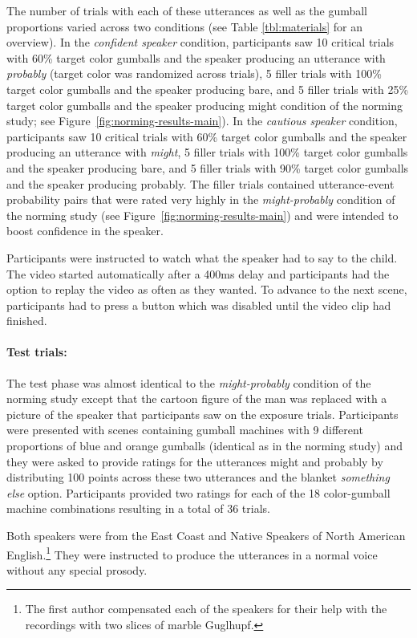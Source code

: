 \documentclass[lucida,biblatex]{sp} %
\newcommand{\figref}[1]{Figure~\ref{#1}}
\begin{document}
The number of trials with each of these utterances as well as the gumball proportions varied across two conditions (see Table \ref{tbl:materials} for an overview). In the {\it confident speaker} condition, participants saw 10 critical trials with 60\% target color gumballs and the speaker producing an utterance with \emph{probably} (target color was randomized across trials), 5 filler trials with 100\% target color gumballs and the speaker producing {\sc bare}, and 5 filler trials with 25\% target color gumballs and the speaker producing {\sc might} condition of the norming study; see \figref{fig:norming-results-main}). In the {\it cautious speaker} condition, participants saw 10 critical trials with 60\% target color gumballs and the speaker producing an utterance with \emph{might}, 5 filler trials with 100\% target color gumballs and the speaker producing {\sc bare}, and 5 filler trials with 90\% target color gumballs and the speaker producing {\sc probably}. The filler trials contained utterance-event probability pairs that were rated very highly in the \textit{might-probably} condition of the norming study (see \figref{fig:norming-results-main}) and were intended to boost confidence in the speaker.

Participants were instructed to watch what the speaker had to say to the child. The video started automatically after a 400ms delay and participants had the option to replay the video as often as they wanted. To advance to the next scene, participants had to press a button which was disabled until the video clip had finished.

\paragraph{Test trials:} The test phase was almost identical to the  \textit{might-probably} condition of the norming study except that the cartoon figure of the man was replaced with a picture of the speaker that participants saw on the exposure trials. Participants were presented with scenes containing gumball machines with 9 different proportions of blue and orange gumballs  (identical as in the norming study) and they were asked to provide ratings for the utterances {\sc might} and {\sc probably} by distributing 100 points across these two utterances and the blanket {\it something else} option. Participants provided two ratings for each of the 18 color-gumball machine combinations resulting in a total of 36 trials. 

Both speakers were from the East Coast and Native Speakers of North American English.\footnote{The first author compensated each of the speakers for their help with the recordings with two slices of marble Guglhupf.} They were instructed to produce the utterances in a normal voice without any special prosody.
\end{document}
